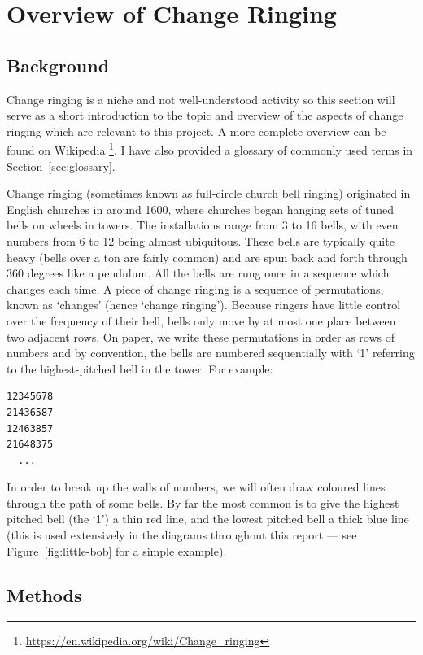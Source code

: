 \documentclass[12pt]{article}
\newcommand{\footurl}[1]{\footnote{\url{#1}}}
\begin{document}
\section{Overview of Change Ringing}

\subsection{Background}

Change ringing is a niche and not well-understood activity so this section will serve as a short
introduction to the topic and overview of the aspects of change ringing which are relevant to this
project.  A more complete overview can be found on
Wikipedia \footurl{https://en.wikipedia.org/wiki/Change_ringing}.  I have also provided a glossary of
commonly used terms in Section~\ref{sec:glossary}.

Change ringing (sometimes known as full-circle church bell ringing) originated in English
churches in around 1600, where churches began hanging sets of tuned bells on wheels in towers.
The installations range from 3 to 16 bells, with even numbers from 6 to 12 being almost ubiquitous.
These bells are typically quite heavy (bells over a ton are fairly common) and are spun
back and forth through 360 degrees like a pendulum.  All the bells are rung once in a sequence which
changes each time.  A piece of change ringing is a sequence of permutations, known as `changes'
(hence `change ringing').  Because ringers have little control over the frequency of their bell,
bells only move by at most one place between two adjacent rows.  On paper, we write these
permutations in order as rows of numbers and by convention, the bells are numbered sequentially with
`1' referring to the highest-pitched bell in the tower.  For example:

\begin{verbatim}
12345678
21436587
12463857
21648375
  ...
\end{verbatim}

In order to break up the walls of numbers, we will often draw coloured lines through the path of
some bells.  By far the most common is to give the highest pitched bell (the `1') a thin red line,
and the lowest pitched bell a thick blue line (this is used extensively in the diagrams throughout
this report --- see Figure~\ref{fig:little-bob} for a simple example).  

\subsection{Methods}
\end{document}
